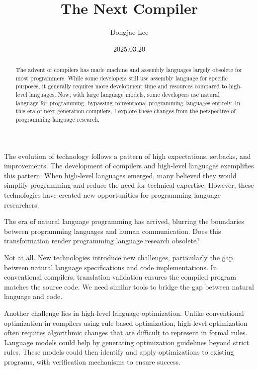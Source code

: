\documentclass[11pt, oneside]{article}   	%
\title{The Next Compiler}
\author{Dongjae Lee}
\date{2025.03.20}
\begin{document}
\maketitle


\begin{abstract}
	The advent of compilers has made machine and assembly languages largely obsolete for most programmers. While some developers still use assembly language for specific purposes, it generally requires more development time and resources compared to high-level languages. Now, with large language models, some developers use natural language for programming, bypassing conventional programming languages entirely. In this era of next-generation compilers, I explore these changes from the perspective of programming language research.
\end{abstract}

The evolution of technology follows a pattern of high expectations, setbacks, and improvements. The development of compilers and high-level languages exemplifies this pattern. When high-level languages emerged, many believed they would simplify programming and reduce the need for technical expertise. However, these technologies have created new opportunities for programming language researchers.

The era of natural language programming has arrived, blurring the boundaries between programming languages and human communication. Does this transformation render programming language research obsolete?

Not at all. New technologies introduce new challenges, particularly the gap between natural language specifications and code implementations. In conventional compilers, translation validation ensures the compiled program matches the source code. We need similar tools to bridge the gap between natural language and code.

Another challenge lies in high-level language optimization. Unlike conventional optimization in compilers using rule-based optimization, high-level optimization often requires algorithmic changes that are difficult to represent in formal rules. Language models could help by generating optimization guidelines beyond strict rules. These models could then identify and apply optimizations to existing programs, with verification mechanisms to ensure success.
\end{document}
